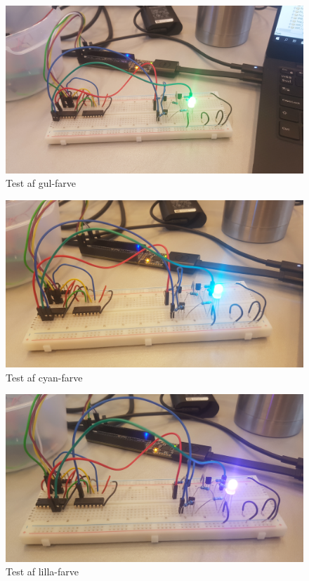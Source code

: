 \documentclass[Modultest/Modultest_main.tex]{subfiles}
\begin{document}
\begin{figure}[H]
    \centering
    \includegraphics[width=\textwidth]{Modultest/CupLight/graphics/color_test1.jpg}
    \caption{Test af gul-farve}
    \label{fig:yellow_led}
\end{figure}

\begin{figure}[H]
    \centering
    \includegraphics[width=\textwidth]{Modultest/CupLight/graphics/color_test2.jpg}
    \caption{Test af cyan-farve}
    \label{fig:cyan_led}
\end{figure}

\begin{figure}[H]
    \centering
    \includegraphics[width=\textwidth]{Modultest/CupLight/graphics/color_test3.jpg}
    \caption{Test af lilla-farve}
    \label{fig:purple_led}
\end{figure}
\end{document}
